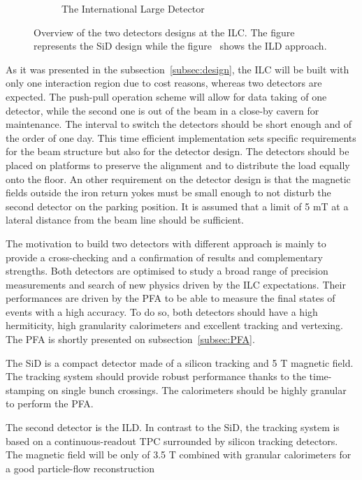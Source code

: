 \begin{figure}[!h]
\begin{subfigure}[t]{0.5\textwidth}
        \caption{\label{fig:ILD} The International Large Detector}
      \end{subfigure}
      \caption{Overview of the two detectors designs at the ILC. The figure~ represents the SiD design while the figure~ shows the ILD approach.\cite{Behnke2010}}
      \label{fig:SiD}
    \end{figure}    

  As it was presented in the subsection~\ref{subsec:design}, the \gls{ILC} will be built with only one interaction region due to cost reasons, whereas two detectors are expected.
  The push-pull operation scheme will allow for data taking of one detector, while the second one is out of the beam in a close-by cavern for maintenance.
  The interval to switch the detectors should be short enough and of the order of one day.
  This time efficient implementation sets specific requirements for the beam structure but also for the detector design.
  The detectors should be placed on platforms to preserve the alignment and to distribute the load equally onto the floor.
  An other requirement on the detector design is that the magnetic fields outside the iron return yokes must be small enough to not disturb the second detector on the parking position.
  It is assumed that a limit of 5 mT at a lateral distance from the beam line should be sufficient.

  The motivation to build two detectors with different approach is mainly to provide a cross-checking and a confirmation of results and complementary strengths.
  Both detectors are optimised to study a broad range of precision measurements and search of new physics driven by the \gls{ILC} expectations.
  Their performances are driven by the \gls{PFA} to be able to measure the final states of events with a high accuracy.
  To do so, both detectors should have a high hermiticity, high granularity calorimeters and excellent tracking and vertexing.
  The \gls{PFA} is shortly presented on subsection~\ref{subsec:PFA}.

  The \gls{SiD} is a compact detector made of a silicon tracking and 5 T magnetic field.
  The tracking system should provide robust performance thanks to the time-stamping on single bunch crossings.
  The calorimeters should be highly granular to perform the \gls{PFA}.

  The second detector is the \gls{ILD}.
  In contrast to the \gls{SiD}, the tracking system is based on a continuous-readout \gls{TPC} surrounded by silicon tracking detectors.
  The magnetic field will be only of 3.5 T combined with granular calorimeters for a good particle-flow reconstruction

